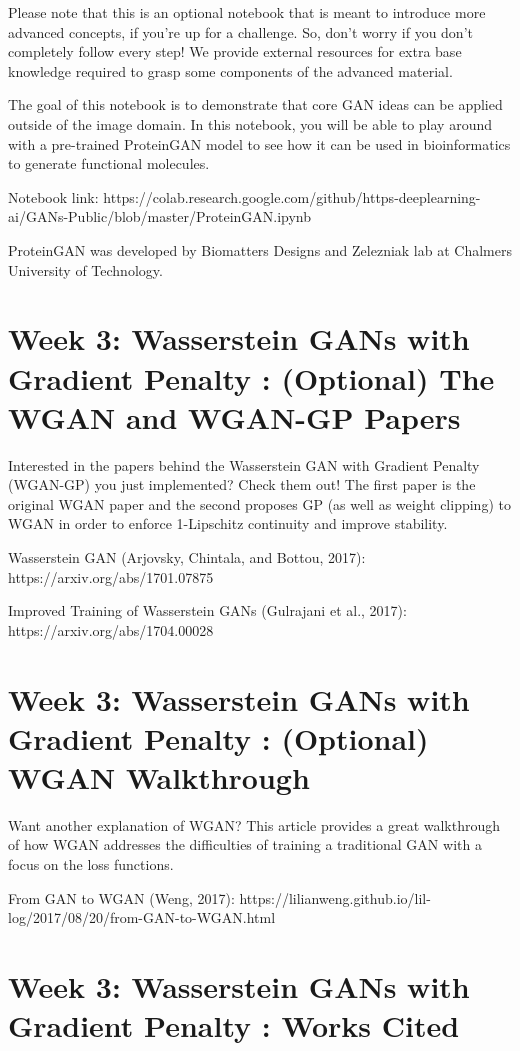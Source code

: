 \documentclass[11pt, onecolumn]{article}
\begin{document}
Please note that this is an optional notebook that is meant to introduce more advanced concepts, if you're up for a challenge. So, don't worry if you don't completely follow every step! We provide external resources for extra base knowledge required to grasp some components of the advanced material.

The goal of this notebook is to demonstrate that core GAN ideas can be applied outside of the image domain. In this notebook, you will be able to play around with a pre-trained ProteinGAN model to see how it can be used in bioinformatics to generate functional molecules.

Notebook link: https://colab.research.google.com/github/https-deeplearning-ai/GANs-Public/blob/master/ProteinGAN.ipynb

ProteinGAN was developed by Biomatters Designs and Zelezniak lab at Chalmers University of Technology.

\section{Week 3: Wasserstein GANs with Gradient Penalty : (Optional) The WGAN and WGAN-GP Papers}

Interested in the papers behind the Wasserstein GAN with Gradient Penalty (WGAN-GP) you just implemented? Check them out! The first paper is the original WGAN paper and the second proposes GP (as well as weight clipping) to WGAN in order to enforce 1-Lipschitz continuity and improve stability.

Wasserstein GAN (Arjovsky, Chintala, and Bottou, 2017): https://arxiv.org/abs/1701.07875

Improved Training of Wasserstein GANs (Gulrajani et al., 2017): https://arxiv.org/abs/1704.00028

\section{Week 3: Wasserstein GANs with Gradient Penalty : (Optional) WGAN Walkthrough}

Want another explanation of WGAN? This article provides a great walkthrough of how WGAN addresses the difficulties of training a traditional GAN with a focus on the loss functions.

From GAN to WGAN (Weng, 2017): https://lilianweng.github.io/lil-log/2017/08/20/from-GAN-to-WGAN.html

\section{Week 3: Wasserstein GANs with Gradient Penalty : Works Cited}
\end{document}
